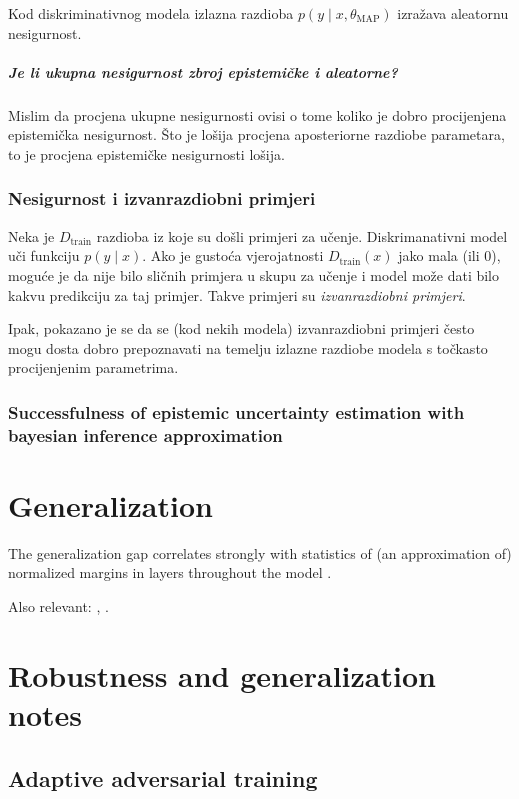 \documentclass[oneside]{book}
\begin{document}
Kod diskriminativnog modela izlazna razdioba $p(y\mid x, \theta_\text{MAP})$ izražava aleatornu nesigurnost.

\paragraph{Je li ukupna nesigurnost zbroj epistemičke i aleatorne?}
Mislim da procjena ukupne nesigurnosti ovisi o tome koliko je dobro procijenjena epistemička nesigurnost. Što je lošija procjena aposteriorne razdiobe parametara, to je procjena epistemičke nesigurnosti lošija.


\subsection{Nesigurnost i izvanrazdiobni primjeri}

Neka je $D_{\text{train}}$ razdioba iz koje su došli primjeri za učenje. Diskrimanativni model uči funkciju $p(y\mid x)$. Ako je gustoća vjerojatnosti $D_{\text{train}}(x)$ jako mala (ili $0$), moguće je da nije bilo sličnih primjera u skupu za učenje i model može dati bilo kakvu predikciju za taj primjer. Takve primjeri su \emph{izvanrazdiobni primjeri}.

Ipak, pokazano je se da se (kod nekih modela) izvanrazdiobni primjeri često mogu dosta dobro prepoznavati na temelju izlazne razdiobe modela s točkasto procijenjenim parametrima. 


\subsection{Successfulness of epistemic uncertainty estimation with bayesian inference approximation}


\chapter{Generalization}

The generalization gap correlates strongly with statistics of (an approximation of) normalized margins in layers throughout the model \citep{Jiang:2019:PGGDNMD}.

Also relevant: \cite{Bartlett:2017:SNMBNN}, \cite{Liao:2018:SLRPTPDN}.


\chapter{Robustness and generalization notes}

\section{Adaptive adversarial training}
\end{document}
